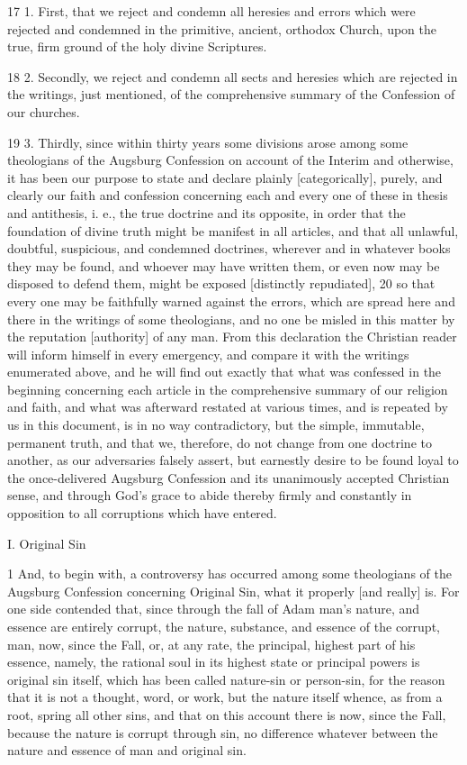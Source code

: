 17 1. First, that we reject and condemn all heresies and errors which were rejected and condemned in the primitive, ancient, orthodox Church, upon the true, firm ground of the holy divine Scriptures.

18 2. Secondly, we reject and condemn all sects and heresies which are rejected in the writings, just mentioned, of the comprehensive summary of the Confession of our churches.

19 3. Thirdly, since within thirty years some divisions arose among some theologians of the Augsburg Confession on account of the Interim and otherwise, it has been our purpose to state and declare plainly [categorically], purely, and clearly our faith and confession concerning each and every one of these in thesis and antithesis, i. e., the true doctrine and its opposite, in order that the foundation of divine truth might be manifest in all articles, and that all unlawful, doubtful, suspicious, and condemned doctrines, wherever and in whatever books they may be found, and whoever may have written them, or even now may be disposed to defend them, might be exposed [distinctly repudiated],
20 so that every one may be faithfully warned against the errors, which are spread here and there in the writings of some theologians, and no one be misled in this matter by the reputation [authority] of any man. From this declaration the Christian reader will inform himself in every emergency, and compare it with the writings enumerated above, and he will find out exactly that what was confessed in the beginning concerning each article in the comprehensive summary of our religion and faith, and what was afterward restated at various times, and is repeated by us in this document, is in no way contradictory, but the simple, immutable, permanent truth, and that we, therefore, do not change from one doctrine to another, as our adversaries falsely assert, but earnestly desire to be found loyal to the once-delivered Augsburg Confession and its unanimously accepted Christian sense, and through God’s grace to abide thereby firmly and constantly in opposition to all corruptions which have entered.

I. Original Sin

1 And, to begin with, a controversy has occurred among some theologians of the Augsburg Confession concerning Original Sin, what it properly [and really] is. For one side contended that, since through the fall of Adam man’s nature, and essence are entirely corrupt, the nature, substance, and essence of the corrupt, man, now, since the Fall, or, at any rate, the principal, highest part of his essence, namely, the rational soul in its highest state or principal powers is original sin itself, which has been called nature-sin or person-sin, for the reason that it is not a thought, word, or work, but the nature itself whence, as from a root, spring all other sins, and that on this account there is now, since the Fall, because the nature is corrupt through sin, no difference whatever between the nature and essence of man and original sin.

